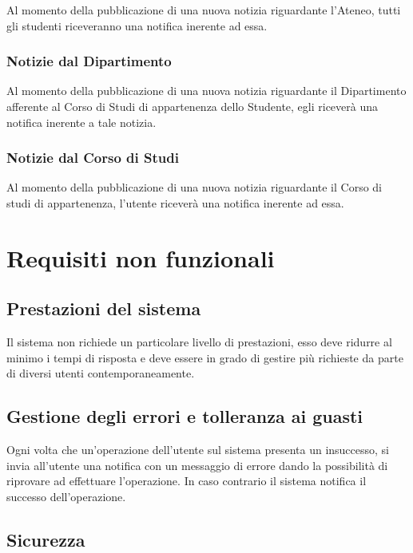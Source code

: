 Al momento della pubblicazione di una nuova notizia riguardante l’Ateneo, tutti gli studenti riceveranno una notifica inerente ad essa.

\subsubsection{Notizie dal Dipartimento}

Al momento della pubblicazione di una nuova notizia riguardante il Dipartimento afferente al Corso di Studi di appartenenza dello Studente, egli riceverà una notifica inerente a tale notizia.

\subsubsection{Notizie dal Corso di Studi}

Al momento della pubblicazione di una nuova notizia riguardante il Corso di studi di appartenenza, l’utente riceverà una notifica inerente ad essa.


\section{Requisiti non funzionali}

\subsection{Prestazioni del sistema}

Il sistema non richiede un particolare livello di prestazioni, esso deve ridurre al minimo i tempi di risposta e deve essere in grado di gestire più richieste da parte di diversi utenti contemporaneamente.

\subsection{Gestione degli errori e tolleranza ai guasti}

Ogni volta che un’operazione dell’utente sul sistema presenta un insuccesso, si invia all’utente una notifica con un messaggio di errore dando la possibilità di riprovare ad effettuare l’operazione. In caso contrario il sistema notifica il successo dell’operazione.

\subsection{Sicurezza}

